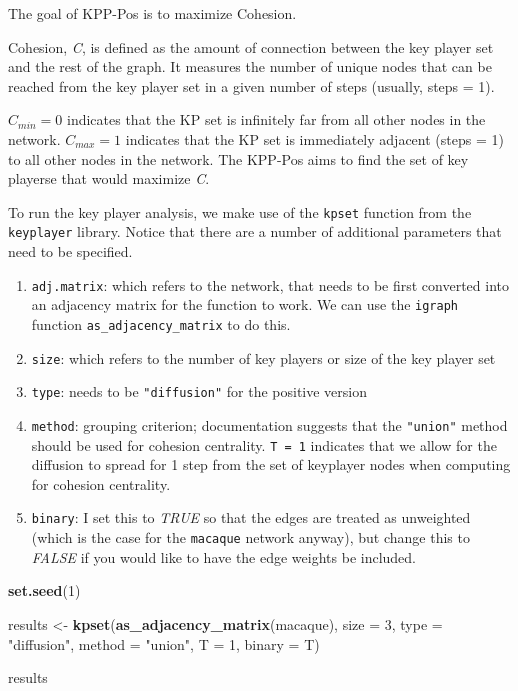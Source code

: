 \documentclass[
]{book}
\newenvironment{Shaded}{\begin{snugshade}}{\end{snugshade}}
\newcommand{\AttributeTok}[1]{\textcolor[rgb]{0.13,0.29,0.53}{#1}}
\newcommand{\DecValTok}[1]{\textcolor[rgb]{0.00,0.00,0.81}{#1}}
\newcommand{\FunctionTok}[1]{\textcolor[rgb]{0.13,0.29,0.53}{\textbf{#1}}}
\newcommand{\NormalTok}[1]{#1}
\newcommand{\OtherTok}[1]{\textcolor[rgb]{0.56,0.35,0.01}{#1}}
\newcommand{\StringTok}[1]{\textcolor[rgb]{0.31,0.60,0.02}{#1}}
\providecommand{\tightlist}{%
  \setlength{\itemsep}{0pt}\setlength{\parskip}{0pt}}
\begin{document}
The goal of KPP-Pos is to maximize Cohesion.

Cohesion, \emph{C}, is defined as the amount of connection between the key player set and the rest of the graph. It measures the number of unique nodes that can be reached from the key player set in a given number of steps (usually, steps = 1).

\(C_{min} = 0\) indicates that the KP set is infinitely far from all other nodes in the network. \(C_{max} = 1\) indicates that the KP set is immediately adjacent (steps = 1) to all other nodes in the network. The KPP-Pos aims to find the set of key playerse that would maximize \emph{C}.

To run the key player analysis, we make use of the \texttt{kpset} function from the \texttt{keyplayer} library. Notice that there are a number of additional parameters that need to be specified.

\begin{enumerate}
\def\labelenumi{(\roman{enumi})}
\tightlist
\item
  \texttt{adj.matrix}: which refers to the network, that needs to be first converted into an adjacency matrix for the function to work. We can use the \texttt{igraph} function \texttt{as\_adjacency\_matrix} to do this.
\item
  \texttt{size}: which refers to the number of key players or size of the key player set
\item
  \texttt{type}: needs to be \texttt{"diffusion"} for the positive version
\item
  \texttt{method}: grouping criterion; documentation suggests that the \texttt{"union"} method should be used for cohesion centrality. \texttt{T\ =\ 1} indicates that we allow for the diffusion to spread for 1 step from the set of keyplayer nodes when computing for cohesion centrality.
\item
  \texttt{binary}: I set this to \emph{TRUE} so that the edges are treated as unweighted (which is the case for the \texttt{macaque} network anyway), but change this to \emph{FALSE} if you would like to have the edge weights be included.
\end{enumerate}

\begin{Shaded}
\begin{Highlighting}[]
\FunctionTok{set.seed}\NormalTok{(}\DecValTok{1}\NormalTok{)}

\NormalTok{results }\OtherTok{\textless{}{-}} \FunctionTok{kpset}\NormalTok{(}\FunctionTok{as\_adjacency\_matrix}\NormalTok{(macaque), }
                 \AttributeTok{size =} \DecValTok{3}\NormalTok{, }
                 \AttributeTok{type =} \StringTok{"diffusion"}\NormalTok{, }
                 \AttributeTok{method =} \StringTok{"union"}\NormalTok{, }
                 \AttributeTok{T =} \DecValTok{1}\NormalTok{, }
                 \AttributeTok{binary =}\NormalTok{ T)}

\NormalTok{results }
\end{Highlighting}
\end{Shaded}
\end{document}
